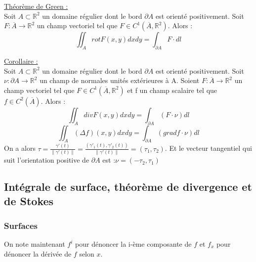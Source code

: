 \documentclass[../main.tex]{subfiles}
\begin{document}
\quad \underline{Théorème de Green :}\\
Soit $A\subset \mathbb{R}^2$ un domaine régulier dont le bord $\partial A$ est orienté positivement. Soit $F:\overline{A} \rightarrow \mathbb{R}^2$ un champ vectoriel tel que $F\in C^1(\overline{A}, \mathbb{R}^2)$. Alors :\\
\begin{equation}
    \iint_A rot F(x,y)dxdy = \int_{\partial A} F\cdot dl
\end{equation}

\quad \underline{Corollaire :}\\
Soit $A\subset \mathbb{R}^2$ un domaine régulier dont le bord $\partial A$ est orienté positivement. Soit $\nu : \partial A \rightarrow \mathbb{R}^2$ un champ de normales unités extérieures à A. Soient $F:\overline{A} \rightarrow \mathbb{R}^2$ un champ vectoriel tel que $F\in C^1(\overline{A}, \mathbb{R}^2)$ et f un champ scalaire tel que $f\in C^2(\overline{A})$. Alors :\\
\begin{equation}
    \iint_A div F(x,y)dxdy = \int_{\partial A}(F\cdot \nu)dl
\end{equation}
\begin{equation}
    \iint_A (\Delta f)(x,y)dxdy = \int_{\partial A} (grad f\cdot \nu)dl
\end{equation}
On a alors $\tau = \frac{\gamma'(t)}{\parallel \gamma'(t)\parallel} = \frac{(\gamma'_1(t), \gamma'_2(t))}{\parallel \gamma'(t)\parallel} = (\tau_1, \tau_2)$. Et le vecteur tangentiel qui suit l'orientation positive de $\partial A$ est :$\nu = (-\tau_2, \tau_1)$

\subsection{Intégrale de surface, théorème de divergence et de Stokes}
\subsubsection{Surfaces}
On note maintenant $f^i$ pour dénoncer la i-ème composante de $f$ et $f_x$ pour dénoncer la dérivée de $f$ selon $x$.\\
\end{document}

